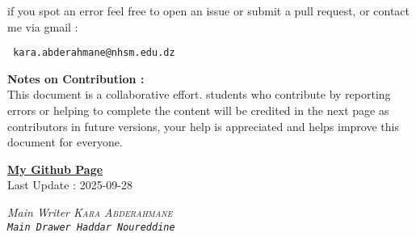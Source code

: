 \documentclass{report}
\begin{document}
\begin{titlepage}
  \begin{center}
    if you spot an error feel free to open an issue or
    submit a pull request, or contact me
    via gmail :
  \end{center}
  \begin{center}
    \normalfont
    \texttt{
      \large kara.abderahmane@nhsm.edu.dz
      \normalfont
    }
  \end{center}
  \noindent \textbf{Notes on Contribution : } \\
  This document is a collaborative effort.
  students who contribute by reporting errors or helping to complete the content
  will be credited in the next page as contributors in future versions,
  your help is appreciated and helps improve this document for everyone.
\end{titlepage}
\begin{titlepage}
  \newpage
  \normalfont
  \vfill
  \begin{center}
    \href{https://github.com/Kapa9102}{\textbf{My Github Page}}\\
    \vspace{0.8cm}
    Last Update : 2025-09-28
  \end{center}
  \begin{tcolorbox}[enhanced, colback=yellow!70!orange!20!white, sharp corners, boxrule=1pt,
    attach boxed title to top center = {yshift = -10pt, xshift = 0pt}, colbacktitle=yellow!30!orange!20!white,
    boxed title style = {boxrule=0pt, arc=4pt}, title=\sc\textcolor{black}{Contributors}]
    \begin{center}
      \it Main Writer \hfill \normalfont  \textsc{Kara Abderahmane}  \\
      \vspace{0.5cm}
      \tt Main Drawer \hfill \normalfont  \tt{Haddar Noureddine}  \\
    \end{center}
  \end{tcolorbox}
\end{titlepage}



\end{document}
